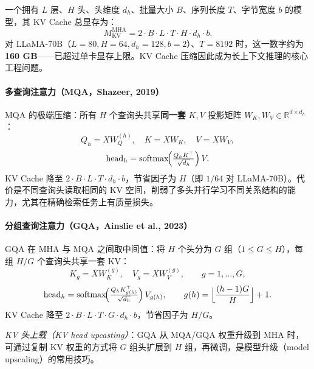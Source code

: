 \documentclass[12pt,a4paper]{article}
\begin{document}
一个拥有 $L$ 层、$H$ 头、头维度 $d_h$、批量大小 $B$、序列长度 $T$、字节宽度 $b$ 的模型，其 KV Cache 总显存为：
\begin{equation}
M_{\mathrm{KV}}^{\mathrm{MHA}} = 2 \cdot B \cdot L \cdot T \cdot H \cdot d_h \cdot b.
\end{equation}
对 LLaMA-70B（$L=80, H=64, d_h=128, b=2$）、$T=8192$ 时，这一数字约为 \textbf{160 GB}——已超过单卡显存上限。KV Cache 压缩因此成为长上下文推理的核心工程问题。

\paragraph{多查询注意力（MQA，Shazeer, 2019）}

MQA 的极端压缩：所有 $H$ 个查询头共享\textbf{同一套} $K, V$ 投影矩阵 $W_K, W_V \in \mathbb{R}^{d \times d_h}$：
\begin{equation}
Q_h = X W_Q^{(h)},\quad K = X W_K,\quad V = X W_V,
\end{equation}
\begin{equation}
\text{head}_h = \mathrm{softmax}\!\Bigl(\tfrac{Q_h K^\top}{\sqrt{d_h}}\Bigr)\, V.
\end{equation}
KV Cache 降至 $2 \cdot B \cdot L \cdot T \cdot d_h \cdot b$，节省因子为 $H$（即 $1/64$ 对 LLaMA-70B）。代价是不同查询头读取相同的 KV 空间，削弱了多头并行学习不同关系结构的能力，尤其在精确检索任务上有质量损失。

\paragraph{分组查询注意力（GQA，Ainslie et al., 2023）}

GQA 在 MHA 与 MQA 之间取中间值：将 $H$ 个头分为 $G$ 组（$1 \le G \le H$），每组 $H/G$ 个查询头共享一套 KV：
\begin{equation}
K_g = X W_K^{(g)},\quad V_g = X W_V^{(g)},\qquad g = 1,\ldots,G,
\end{equation}
\begin{equation}
\text{head}_h = \mathrm{softmax}\!\Bigl(\tfrac{Q_h K_{g(h)}^\top}{\sqrt{d_h}}\Bigr)\, V_{g(h)},\qquad g(h) = \Bigl\lfloor \frac{(h-1)G}{H} \Bigr\rfloor + 1.
\end{equation}
KV Cache 降至 $2 \cdot B \cdot L \cdot T \cdot G \cdot d_h \cdot b$，节省因子为 $H/G$。

\textit{KV 头上载（KV head upcasting）}：GQA 从 MQA/GQA 权重升级到 MHA 时，可通过复制 KV 权重的方式将 $G$ 组头扩展到 $H$ 组，再微调，是模型升级（model upscaling）的常用技巧。
\end{document}
